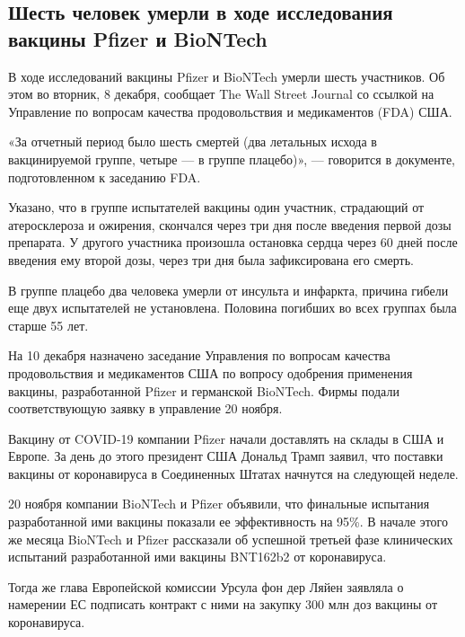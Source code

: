  
 
 
 
 
 
\subsection{Шесть человек умерли в ходе исследования вакцины Pfizer и BioNTech}
\label{sec:08_12_2020.news.ru.mail_ru.1.vaccine_death_pfizer_biontech}

В ходе исследований вакцины Pfizer и BioNTech умерли шесть участников. Об этом
во вторник, 8 декабря, сообщает The Wall Street Journal со ссылкой на
Управление по вопросам качества продовольствия и медикаментов (FDA) США.

«За отчетный период было шесть смертей (два летальных исхода в вакцинируемой
группе, четыре — в группе плацебо)», — говорится в документе, подготовленном к
заседанию FDA.

Указано, что в группе испытателей вакцины один участник, страдающий от
атеросклероза и ожирения, скончался через три дня после введения первой дозы
препарата. У другого участника произошла остановка сердца через 60 дней после
введения ему второй дозы, через три дня была зафиксирована его смерть.

В группе плацебо два человека умерли от инсульта и инфаркта, причина гибели еще
двух испытателей не установлена. Половина погибших во всех группах была старше
55 лет.

На 10 декабря назначено заседание Управления по вопросам качества
продовольствия и медикаментов США по вопросу одобрения применения вакцины,
разработанной Pfizer и германской BioNTech. Фирмы подали соответствующую заявку
в управление 20 ноября.

Вакцину от COVID-19 компании Pfizer начали доставлять на склады в США и Европе.
За день до этого президент США Дональд Трамп заявил, что поставки вакцины от
коронавируса в Соединенных Штатах начнутся на следующей неделе.

20 ноября компании BioNTech и Pfizer объявили, что финальные испытания
разработанной ими вакцины показали ее эффективность на 95\%. В начале этого же
месяца BioNTech и Pfizer рассказали об успешной третьей фазе клинических
испытаний разработанной ими вакцины BNT162b2 от коронавируса.

Тогда же глава Европейской комиссии Урсула фон дер Ляйен заявляла о намерении
ЕС подписать контракт с ними на закупку 300 млн доз вакцины от коронавируса.
